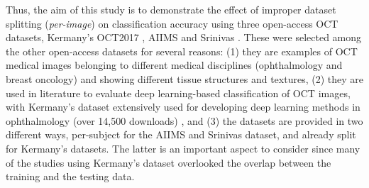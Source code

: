 \documentclass[fleqn,10pt]{wlscirep}
\begin{document}

Thus, the aim of this study is to demonstrate the effect of improper dataset splitting (\textit{per-image}) on classification accuracy using three open-access OCT datasets, Kermany’s OCT2017 \cite{kermany2018large},  AIIMS \cite{butola2019volumetric} and Srinivas \cite{srinivasan2014fully}. These were selected among the other open-access datasets for several reasons: (1) they are examples of OCT medical images belonging to different medical disciplines (ophthalmology and breast oncology) and showing different tissue structures and textures, (2) they are used in literature to evaluate deep learning-based classification of OCT images, with Kermany’s dataset \cite{kermany2018large} extensively used for developing deep learning methods in ophthalmology (over 14,500 downloads) \cite{Retinalkaggle}, and (3) the datasets are provided in two different ways, per-subject for the AIIMS and Srinivas dataset, and already split for Kermany’s datasets. The latter is an important aspect to consider since many of the studies using Kermany’s dataset overlooked the overlap between the training and the testing data. 
\end{document}
